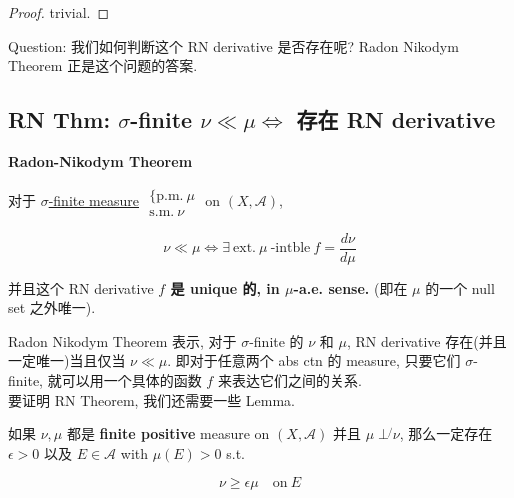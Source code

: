 \documentclass{qlnotes-export}
\begin{document}
\begin{proof}

trivial.

\end{proof}

Question: 我们如何判断这个 RN derivative 是否存在呢? Radon Nikodym Theorem 正是这个问题的答案.

\subsection{\texorpdfstring{RN Thm: \(\sigma\)-finite \(\nu \ll \mu\Leftrightarrow\) 存在 RN derivative}{RN Thm: \textbackslash sigma-finite \textbackslash nu \textbackslash ll \textbackslash mu\textbackslash Leftrightarrow 存在 RN derivative}}\label{rn-thm-sigma-finite-nu-ll-muleftrightarrow-ux5b58ux5728-rn-derivative}

\begin{theorem}{\protect{}\label{kn-radon-nikodym-theorem}{\textbf{Radon-Nikodym
Theorem}}}

对于 \href{https://qiulinfan.github.io/notes/math/measure-theory/\#kn-sigma-finite-measure}{\(\sigma\)-finite measure} \(\begin{matrix}
{\{\text{p.m.}\ \mu} \\
{\text{s.m.}\ \nu}
\end{matrix}\) on \((X,\mathcal{A})\),

\[\nu \ll \mu\Leftrightarrow\exists\ \text{ext.}\ \mu\ \text{-intble}\ f = \frac{d\nu}{d\mu}\]

并且这个 RN derivative \textbf{\(f\) 是 \textbf{unique 的, in \(\mu\)-a.e. sense.}} (即在 \(\mu\) 的一个 null set 之外唯一).

\end{theorem}

Radon Nikodym Theorem 表示, 对于 \(\sigma\)-finite 的 \(\nu\) 和 \(\mu\), RN derivative 存在(并且一定唯一)当且仅当 \(\nu \ll \mu\). 即对于任意两个 abs ctn 的 measure, 只要它们 \(\sigma\)-finite, 就可以用一个具体的函数 \(f\) 来表达它们之间的关系.\\
要证明 RN Theorem, 我们还需要一些 Lemma.

\begin{lemma}

如果 \(\nu,\mu\) 都是 \textbf{finite positive} measure on \((X,\mathcal{A})\) 并且 \(\mu\operatorname{\perp\not{}}\nu\), 那么一定存在 \(\epsilon > 0\) 以及 \(E \in \mathcal{A}\) with \(\mu(E) > 0\) s.t.

\[\nu \geq \epsilon\mu\quad\text{on}\ E\]

\end{lemma}
\end{document}
